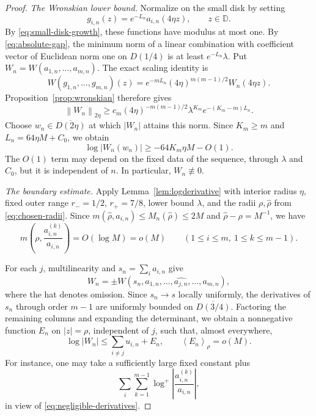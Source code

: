 \documentclass[12pt,letterpaper,reqno]{amsart}
\theoremstyle{definition}
\numberwithin{equation}{section}
\newcommand{\D}{\mathbb D}
\newcommand{\norm}[2]{\left\lVert #1\right\rVert_{#2}}
\newcommand{\mean}[2]{\left\langle #1\right\rangle_{#2}}
\begin{document}
\begin{proof}
		\smallskip\noindent\emph{The Wronskian lower bound.}
		Normalize on the small disk by setting
		\begin{equation*}
			g_{i,n}(z)=e^{-L_n}a_{i,n}(4\eta z),\qquad z\in\D.
		\end{equation*}
		By \eqref{eq:small-disk-growth}, these functions have modulus at most
		one. By \eqref{eq:absolute-gap}, the minimum norm of a linear combination with coefficient vector of Euclidean norm one on $D(1/4)$ is
		at least $e^{-L_n}\lambda$. Put
		$W_n=W(a_{1,n},\ldots,a_{m,n})$. The exact scaling identity is
		\begin{equation*}
			W(g_{1,n},\ldots,g_{m,n})(z)
			=e^{-mL_n}(4\eta)^{m(m-1)/2}W_n(4\eta z).
		\end{equation*}
		Proposition~\ref{prop:wronskian} therefore gives
		\begin{equation*}
			\norm{W_n}{2\eta}
			\ge c_m(4\eta)^{-m(m-1)/2}
			\lambda^{K_m}e^{-(K_m-m)L_n}.
		\end{equation*}
		Choose $w_n\in\overline{D(2\eta)}$ at which $|W_n|$ attains this
		norm. Since $K_m\ge m$ and $L_n=64\eta M+C_0$, we obtain
		\begin{equation}\label{eq:wronskian-point-lower}
			\log|W_n(w_n)|\ge-64K_m\eta M-O(1).
		\end{equation}
		The $O(1)$ term may depend on the fixed data of the sequence, through
		$\lambda$ and $C_0$, but it is independent of $n$. In particular,
		$W_n\not\equiv0$.
		
		\smallskip\noindent\emph{The boundary estimate.}
		Apply Lemma~\ref{lem:logderivative} with interior radius $\eta$, fixed
		outer range $r_-=1/2$, $r_+=7/8$, lower bound $\lambda$, and the radii
		$\rho,\widehat\rho$ from \eqref{eq:chosen-radii}. Since
		$m(\widehat\rho,a_{i,n})\le M_n(\widehat\rho)\le2M$ and
		$\widehat\rho-\rho=M^{-1}$, we have
		\begin{equation}\label{eq:negligible-derivatives}
			m\left(\rho,\frac{a_{i,n}^{(k)}}{a_{i,n}}\right)
			=O(\log M)=o(M)
			\qquad(1\le i\le m,\ 1\le k\le m-1).
		\end{equation}
		
		For each $j$, multilinearity and $s_n=\sum_i a_{i,n}$ give
		\begin{equation*}
			W_n=\pm W(s_n,a_{1,n},\ldots,\widehat{a_{j,n}},\ldots,a_{m,n}),
		\end{equation*}
		where the hat denotes omission. Since $s_n\to s$ locally uniformly,
		the derivatives of $s_n$ through order $m-1$ are uniformly bounded on
		$\overline{D(3/4)}$. Factoring the remaining columns and expanding the
		determinant, we obtain a nonnegative function $E_n$ on $|z|=\rho$,
		independent of $j$, such that, almost everywhere,
		\begin{equation*}
			\log|W_n|\le\sum_{i\ne j}u_{i,n}+E_n,
			\qquad \mean{E_n}{\rho}=o(M).
		\end{equation*}
		For instance, one may take a sufficiently large fixed constant plus
		\begin{equation*}
			\sum_i\sum_{k=1}^{m-1}
			\log^+\left|\frac{a_{i,n}^{(k)}}{a_{i,n}}\right|,
		\end{equation*}
		in view of \eqref{eq:negligible-derivatives}.
		

\end{proof}
\end{document}
